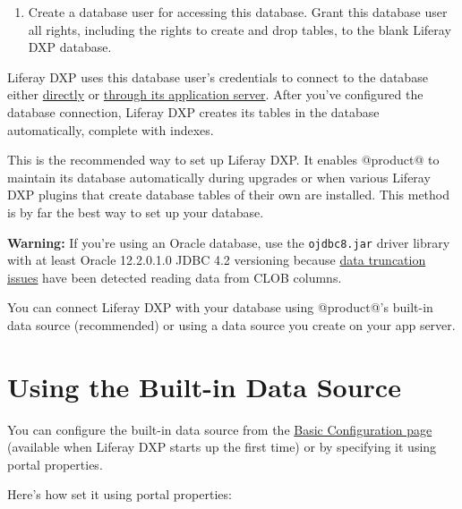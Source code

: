 \noindent\hrulefill

\begin{enumerate}
\def\labelenumi{\arabic{enumi}.}
\setcounter{enumi}{1}
\tightlist
\item
  Create a database user for accessing this database. Grant this
  database user all rights, including the rights to create and drop
  tables, to the blank Liferay DXP database.
\end{enumerate}

Liferay DXP uses this database user's credentials to connect to the
database either \hyperref[using-the-built-in-data-source]{directly} or
\hyperref[using-a-data-source-on-your-application-server]{through its
application server}. After you've configured the database connection,
Liferay DXP creates its tables in the database automatically, complete
with indexes.

This is the recommended way to set up Liferay DXP. It enables @product@
to maintain its database automatically during upgrades or when various
Liferay DXP plugins that create database tables of their own are
installed. This method is by far the best way to set up your database.

\noindent\hrulefill

\textbf{Warning:} If you're using an Oracle database, use the
\texttt{ojdbc8.jar} driver library with at least Oracle 12.2.0.1.0 JDBC
4.2 versioning because
\href{https://issues.liferay.com/browse/LPS-79229}{data truncation
issues} have been detected reading data from CLOB columns.

\noindent\hrulefill

You can connect Liferay DXP with your database using @product@'s
built-in data source (recommended) or using a data source you create on
your app server.

\section{Using the Built-in Data
Source}\label{using-the-built-in-data-source}

You can configure the built-in data source from the
\href{/docs/7-2/deploy/-/knowledge_base/d/installing-product\#using-the-setup-wizard}{Basic
Configuration page} (available when Liferay DXP starts up the first
time) or by specifying it using portal properties.

Here's how set it using portal properties:


